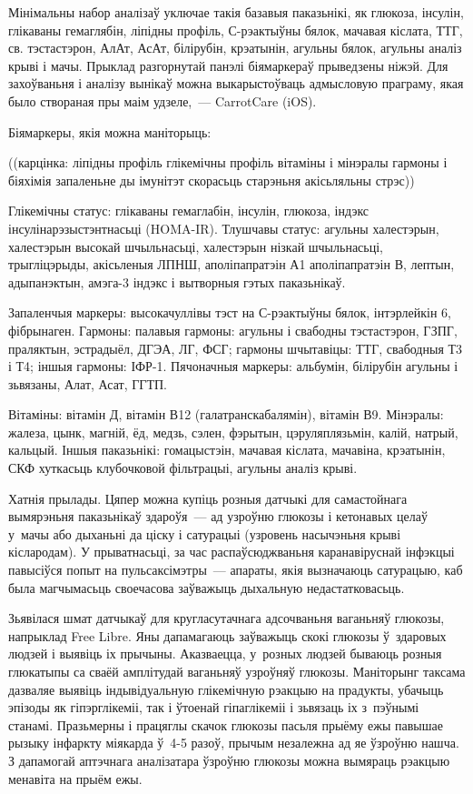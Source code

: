 Мінімальны набор аналізаў уключае такія базавыя паказьнікі, як глюкоза, інсулін, глікаваны гемаглябін, ліпідны профіль, С-рэактыўны бялок, мачавая кіслата, ТТГ, св. тэстастэрон, АлАт, АсАт, білірубін, крэатынін, агульны бялок, агульны аналіз крыві і мачы. Прыклад разгорнутай панэлі біямаркераў прыведзены ніжэй. Для захоўваньня і аналізу вынікаў можна выкарыстоўваць адмысловую праграму, якая было створаная пры маім удзеле,~--- CarrotCare (iOS).

Біямаркеры, якія можна маніторыць:

((карцінка: ліпідны профіль глікемічны профіль вітаміны і мінэралы гармоны і біяхімія запаленьне ды імунітэт скорасьць старэньня акісьляльны стрэс))

Глікемічны статус: глікаваны гемаглабін, інсулін, глюкоза, індэкс інсулінарэзыстэнтнасьці (HOMA-IR). Тлушчавы статус: агульны халестэрын, халестэрын высокай шчыльнасьці, халестэрын нізкай шчыльнасьці, трыгліцэрыды, акісьленыя ЛПНШ, аполіпапратэін А1 аполіпапратэін В, лептын, адыпанэктын, амэга-3 індэкс і вытворныя гэтых паказьнікаў.

Запаленчыя маркеры: высокачуллівы тэст на С-рэактыўны бялок, інтэрлейкін 6, фібрынаген. Гармоны: палавыя гармоны: агульны і свабодны тэстастэрон, ГЗПГ, праляктын, эстрадыёл, ДГЭА, ЛГ, ФСГ; гармоны шчытавіцы: ТТГ, свабодныя Т3 і Т4; іншыя гармоны: ІФР-1. Пячоначныя маркеры: альбумін, білірубін агульны і зьвязаны, Алат, Асат, ГГТП.

Вітаміны: вітамін Д, вітамін В12 (галатранскабалямін), вітамін В9. Мінэралы: жалеза, цынк, магній, ёд, медзь, сэлен, фэрытын, цэруляплязьмін, калій, натрый, кальцый. Іншыя паказьнікі: гомацыстэін, мачавая кіслата, мачавіна, крэатынін, СКФ хуткасьць клубочковой фільтрацыі, агульны аналіз крыві.

Хатнія прылады. Цяпер можна купіць розныя датчыкі для самастойнага вымярэньня паказьнікаў здароўя~--- ад узроўню глюкозы і кетонавых целаў у~мачы або дыханьні да ціску і сатурацыі (узровень насычэньня крыві кіслародам). У прыватнасьці, за час распаўсюджваньня каранавіруснай інфэкцыі павысіўся попыт на пульсаксімэтры~--- апараты, якія вызначаюць сатурацыю, каб была магчымасьць своечасова заўважыць дыхальную недастатковасьць.

Зьявілася шмат датчыкаў для кругласутачнага адсочваньня ваганьняў глюкозы, напрыклад Free Libre. Яны дапамагаюць заўважыць скокі глюкозы ў~здаровых людзей і выявіць іх прычыны. Аказваецца, у~розных людзей бываюць розныя глюкатыпы са сваёй амплітудай ваганьняў узроўняў глюкозы. Маніторынг таксама дазваляе выявіць індывідуальную глікемічную рэакцыю на прадукты, убачыць эпізоды як гіпэрглікеміі, так і ўтоенай гіпаглікеміі і зьвязаць іх з~пэўнымі станамі. Празьмерны і працяглы скачок глюкозы пасьля прыёму ежы павышае рызыку інфаркту міякарда ў~4-5 разоў, прычым незалежна ад яе ўзроўню нашча. З дапамогай аптэчнага аналізатара ўзроўню глюкозы можна вымяраць рэакцыю менавіта на прыём ежы.

